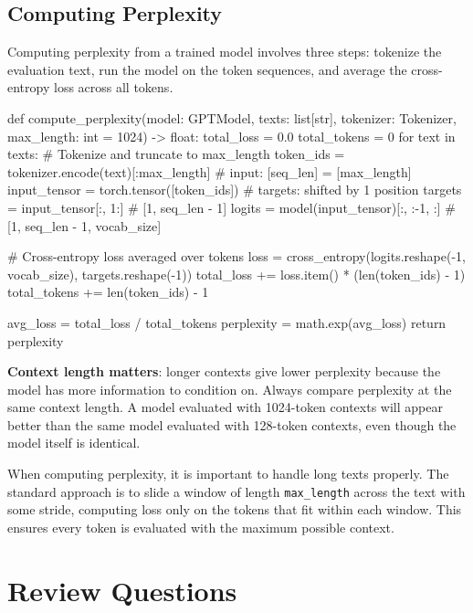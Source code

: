 \subsection{Computing Perplexity}

Computing perplexity from a trained model involves three steps: tokenize
the evaluation text, run the model on the token sequences, and average the
cross-entropy loss across all tokens.

\begin{pseudocode}
def compute_perplexity(model: GPTModel, texts: list[str],
                       tokenizer: Tokenizer,
                       max_length: int = 1024) -> float:
    total_loss = 0.0
    total_tokens = 0
    for text in texts:
        # Tokenize and truncate to max_length
        token_ids = tokenizer.encode(text)[:max_length]
        # input: [seq_len] = [max_length]
        input_tensor = torch.tensor([token_ids])
        # targets: shifted by 1 position
        targets = input_tensor[:, 1:]   # [1, seq_len - 1]
        logits = model(input_tensor)[:, :-1, :]  # [1, seq_len - 1, vocab_size]

        # Cross-entropy loss averaged over tokens
        loss = cross_entropy(logits.reshape(-1, vocab_size),
                             targets.reshape(-1))
        total_loss += loss.item() * (len(token_ids) - 1)
        total_tokens += len(token_ids) - 1

    avg_loss = total_loss / total_tokens
    perplexity = math.exp(avg_loss)
    return perplexity
\end{pseudocode}

\begin{keyconcept}
  \textbf{Context length matters}: longer contexts give lower perplexity
  because the model has more information to condition on. Always compare
  perplexity at the same context length. A model evaluated with 1024-token
  contexts will appear better than the same model evaluated with 128-token
  contexts, even though the model itself is identical.
\end{keyconcept}

When computing perplexity, it is important to handle long texts properly.
The standard approach is to slide a window of length \texttt{max\_length}
across the text with some stride, computing loss only on the tokens that
fit within each window. This ensures every token is evaluated with the
maximum possible context.

\section*{Review Questions}

